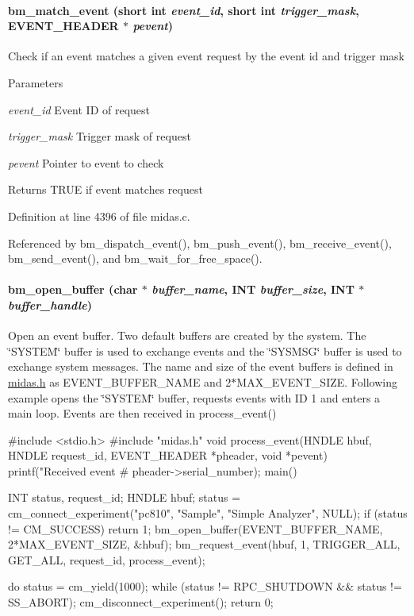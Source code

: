 \paragraph[{bm\_\-match\_\-event}]{ bm\_\-match\_\-event (short int {\em event\_\-id}, \/  short int {\em trigger\_\-mask}, \/  {\bf EVENT\_\-HEADER} $\ast$ {\em pevent})}\hfill\label{group__bmfunctionc_ga181dcf462745127aa3d011a2e3fee805}
Check if an event matches a given event request by the event id and trigger mask 
\begin{DoxyParams}{Parameters}
\item[{\em event\_\-id}]Event ID of request \item[{\em trigger\_\-mask}]Trigger mask of request \item[{\em pevent}]Pointer to event to check \end{DoxyParams}
\begin{DoxyReturn}{Returns}
TRUE if event matches request 
\end{DoxyReturn}


Definition at line 4396 of file midas.c.

Referenced by bm\_\-dispatch\_\-event(), bm\_\-push\_\-event(), bm\_\-receive\_\-event(), bm\_\-send\_\-event(), and bm\_\-wait\_\-for\_\-free\_\-space().
\paragraph[{bm\_\-open\_\-buffer}]{ bm\_\-open\_\-buffer (char $\ast$ {\em buffer\_\-name}, \/  {\bf INT} {\em buffer\_\-size}, \/  {\bf INT} $\ast$ {\em buffer\_\-handle})}\hfill\label{group__bmfunctionc_gae9636ff3e34ee94e31cb292bd07a679d}
Open an event buffer. Two default buffers are created by the system. The \char`\"{}SYSTEM\char`\"{} buffer is used to exchange events and the \char`\"{}SYSMSG\char`\"{} buffer is used to exchange system messages. The name and size of the event buffers is defined in \hyperlink{midas_8h}{midas.h} as EVENT\_\-BUFFER\_\-NAME and 2$\ast$MAX\_\-EVENT\_\-SIZE. Following example opens the \char`\"{}SYSTEM\char`\"{} buffer, requests events with ID 1 and enters a main loop. Events are then received in process\_\-event() 
\begin{DoxyCode}
#include <stdio.h>
#include "midas.h"
void process_event(HNDLE hbuf, HNDLE request_id,
           EVENT_HEADER *pheader, void *pevent)
{
  printf("Received event #%
  pheader->serial_number);
}
main()
{
  INT status, request_id;
  HNDLE hbuf;
  status = cm_connect_experiment("pc810", "Sample", "Simple Analyzer", NULL);
  if (status != CM_SUCCESS)
  return 1;
  bm_open_buffer(EVENT_BUFFER_NAME, 2*MAX_EVENT_SIZE, &hbuf);
  bm_request_event(hbuf, 1, TRIGGER_ALL, GET_ALL, request_id, process_event);

  do
  {
   status = cm_yield(1000);
  } while (status != RPC_SHUTDOWN && status != SS_ABORT);
  cm_disconnect_experiment();
  return 0;
}
\end{DoxyCode}
 
